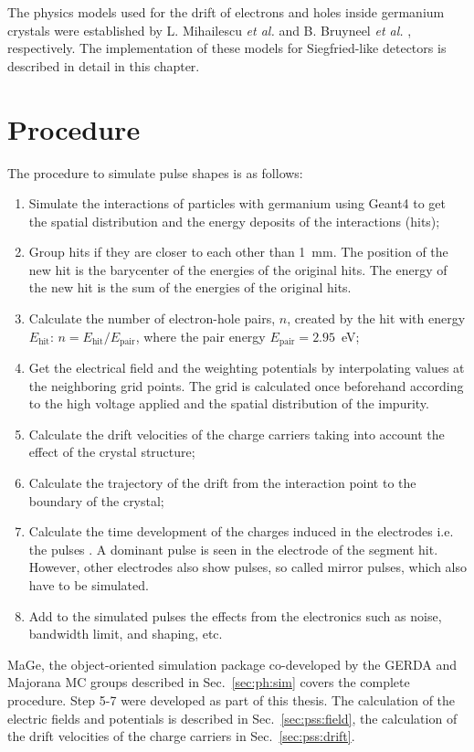 The physics models used for the drift of electrons and holes inside
germanium crystals were established by L. Mihailescu \textit{et
al.}\cite{miha} and B. Bruyneel \emph{et al.} \cite{bart},
respectively. The implementation of these models for Siegfried-like
detectors is described in detail in this chapter.


\section{Procedure}
\label{sec:pss:proc}
The procedure to simulate pulse shapes \cite{agata} is as follows:
\begin{enumerate} 
\item Simulate the interactions of particles with germanium using
Geant4 to get the spatial distribution and the energy deposits of the
interactions (hits);
\item Group hits if they are closer to each other than 1~mm. The
position of the new hit is the barycenter of the energies of the
original hits. The energy of the new hit is the sum of the energies of
the original hits.
\item Calculate the number of electron-hole pairs, $n$, created by the
hit with energy $E_{\text{hit}}$: $n = E_{\text{hit}} /
E_{\text{pair}}$, where the pair energy $E_{\text{pair}} = 2.95$~eV;
\item Get the electrical field and the weighting potentials by
interpolating values at the neighboring grid points. The grid is
calculated once beforehand according to the high voltage applied and
the spatial distribution of the impurity. \cite{Gat82, Rad88, He00}
\item Calculate the drift velocities of the charge carriers taking
into account the effect of the crystal structure;
\item Calculate the trajectory of the drift from the interaction point
to the boundary of the crystal;
\item Calculate the time development of the charges induced in the
electrodes i.e. the pulses \cite{igex}. A dominant pulse is seen in
the electrode of the segment hit. However, other electrodes also show
pulses, so called mirror pulses, which also have to be simulated.
\item Add to the simulated pulses the effects from the electronics
such as noise, bandwidth limit, and shaping, etc.
\end{enumerate} 
MaGe, the object-oriented simulation package co-developed by the GERDA
and Majorana MC groups described in Sec.~\ref{sec:ph:sim} covers the
complete procedure. Step 5-7 were developed as part of this
thesis. The calculation of the electric fields and potentials is
described in Sec.~\ref{sec:pss:field}, the calculation of the drift
velocities of the charge carriers in Sec.~\ref{sec:pss:drift}.
 
